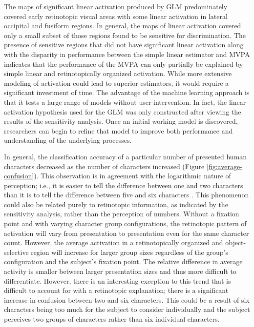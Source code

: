 \documentclass[5p,authoryear]{elsarticle}
\begin{document}
The maps of significant linear activation produced by GLM predominately covered early retinotopic visual areas with some linear activation in lateral occipital and fusiform regions.
In general, the maps of linear activation covered only a small subset of those regions found to be sensitive for discrimination.
The presence of sensitive regions that did not have significant linear activation along with the disparity in performance between the simple linear estimator and MVPA indicates that the performance of the MVPA can only partially be explained by simple linear and retinotopically organized activation.
While more extensive modeling of activation could lead to superior estimators, it would require a significant investment of time.
The advantage of the machine learning approach is that it tests a large range of models without user intervention.
In fact, the linear activation hypothesis used for the GLM was only constructed after viewing the results of the sensitivity analysis.
Once an initial working model is discovered, researchers can begin to refine that model to improve both performance and understanding of the underlying processes.

In general, the classification accuracy of a particular number of presented human characters decreased as the number of characters increased (Figure \ref{fig:average-confusion}).
This observation is in agreement with the logarithmic nature of perception; i.e., it is easier to tell the difference between one and two characters than it is to tell the difference between five and six characters \citep{Shepard1975,Dehaene2003}.
This phenomenon could also be related purely to retinotopic information, as indicated by the sensitivity analysis, rather than the perception of numbers.
Without a fixation point and with varying character group configurations, the retinotopic pattern of activation will vary from presentation to presentation even for the same character count.
However, the average activation in a retinotopically organized and object-selective region will increase for larger group sizes regardless of the group's configuration and the subject's fixation point.
The relative difference in average activity is smaller between larger presentation sizes and thus more difficult to differentiate.
However, there is an interesting exception to this trend that is difficult to account for with a retinotopic explanation; there is a significant increase in confusion between two and six characters.
This could be a result of six characters being too much for the subject to consider individually and the subject perceives two groups of characters rather than six individual characters.
\end{document}
